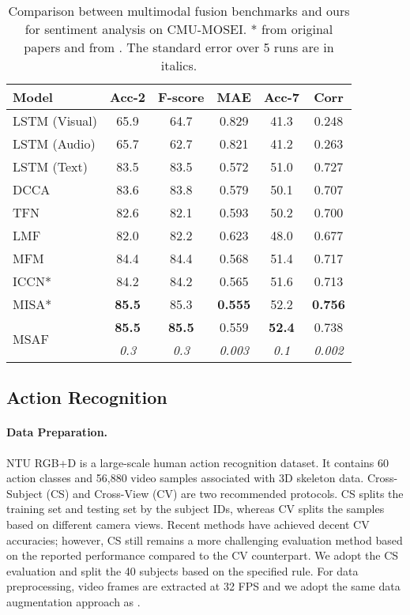 \documentclass[10pt,twocolumn,letterpaper]{article}
\begin{document}
\begin{table}[t]
  \centering
  \small
    \begin{tabular}{lccccc}
      Model & Acc-2 & F-score & MAE & Acc-7 & Corr\\
      \hline
      LSTM (Visual) & 65.9 & 64.7 & 0.829 & 41.3 & 0.248\\
      LSTM (Audio) & 65.7 & 62.7 & 0.821 & 41.2 & 0.263\\
      LSTM (Text) & 83.5 & 83.5 & 0.572 & 51.0 & 0.727\\
      \hline
      DCCA & 83.6 & 83.8 & 0.579 & 50.1 & 0.707\\
      TFN & 82.6 & 82.1 & 0.593 & 50.2 & 0.700\\
      LMF & 82.0 & 82.2 & 0.623 & 48.0 & 0.677\\
      MFM & 84.4 & 84.4 & 0.568 & 51.4 & 0.717\\
      ICCN* & 84.2 & 84.2 & 0.565 & 51.6 & 0.713\\
      MISA* & \textbf{85.5} & 85.3 & \textbf{0.555} & 52.2 & \textbf{0.756}\\
      \hline
      \multirow{2}{*}{MSAF} & \textbf{85.5} & \textbf{85.5} & 0.559 & \textbf{52.4} & 0.738\\
      & \textit{0.3} & \textit{0.3} & \textit{0.003} & \textit{0.1} & \textit{0.002} \\
      \hline
    \end{tabular}
    \caption{Comparison between multimodal fusion benchmarks and ours for sentiment analysis on CMU-MOSEI. * from original papers and  from \cite{sun2019learning}. The standard error over 5 runs are in italics.}
    \label{table2}
\end{table}

\subsection{Action Recognition}
\paragraph{Data Preparation.}
NTU RGB+D \cite{shahroudy2016ntu} is a large-scale human action recognition dataset. It contains 60 action classes and 56,880 video samples associated with 3D skeleton data. Cross-Subject (CS) and Cross-View (CV) are two recommended protocols. CS splits the training set and testing set by the subject IDs, whereas CV splits the samples based on different camera views. Recent methods \cite{yang2020feedback, liu2018recognizing, de2020infrared} have achieved decent CV accuracies; however, CS still remains a more challenging evaluation method based on the reported performance compared to the CV counterpart. We adopt the CS evaluation and split the 40 subjects based on the specified rule. For data preprocessing, video frames are extracted at 32 FPS and we adopt the same data augmentation approach as \cite{joze2020mmtm}. 
\end{document}
